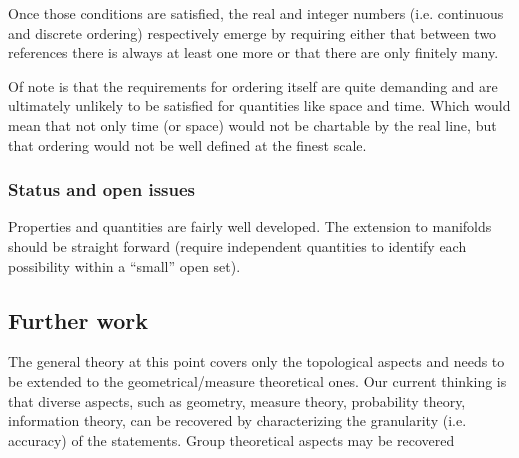 \documentclass[twocolumn]{article}
\newif\ifextended
\newcommand\fact[2]{\ifextended \emph{#1}. #2 \fi}
\begin{document}
Once those conditions are satisfied, the real and integer numbers (i.e. continuous and discrete ordering) respectively emerge by requiring either that between two references there is always at least one more or that there are only finitely many.

Of note is that the requirements for ordering itself are quite demanding and are ultimately unlikely to be satisfied for quantities like space and time. Which would mean that not only time (or space) would not be chartable by the real line, but that ordering would not be well defined at the finest scale.

\subsubsection{Status and open issues}

Properties and quantities are fairly well developed. The extension to manifolds should be straight forward (require independent quantities to identify each possibility within a ``small'' open set).

\subsection{Further work}

The general theory at this point covers only the topological aspects and needs to be extended to the geometrical/measure theoretical ones. Our current thinking is that diverse aspects, such as geometry, measure theory, probability theory, information theory, can be recovered by characterizing the granularity (i.e. accuracy) of the statements. Group theoretical aspects may be recovered 

\fact{Granularity as foundational concept} {As each statement corresponds to a Borel set of possibilities, assigning a size to these sets effectively means giving a size to the statements themselves. For geometry, two sets have the same volume because they contain the same number of possible spatial points. For probability, borrowing idea from Cox probable inference, we would assign probability only on conditional statements, therefore the $P(s_1 | s_2)$ would measure what fraction of the possibilities compatible with $s_2$ are also compatible with $s_1$. For information theory, given two statements the logarithm of the ratio of the size of the possibilities corresponds to the number of yes/no questions that are needed to go from one statement to the other, the relative information.}
\end{document}

